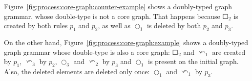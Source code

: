 \begin{example} \mbox{Figure~\ref{fig:process:core-graph:counter-example}} shows a doubly-typed graph grammar, whose double-type is not a core graph. That happens because $\Square_2$ is created by both rules $p_1$ and $p_2$, as well as $\Circle_1$ is deleted by both $p_2$ and $p_3$.

  On the other hand, Figure~\ref{fig:process:core-graph:example} shows a doubly-typed graph grammar whose double-type is also a core graph: $\Square_2$ and $\curvearrowleft_1$ are created by $p_1$, $\curvearrowleft_3$ by $p_2$, $\Circle_3$ and $\curvearrowleft_2$ by $p_3$ and $\Circle_1$ is present on the initial graph. Also, the deleted elements are deleted only once: $\Circle_1$ and
  $\curvearrowleft_1$ by $p_3$.


\end{example}

